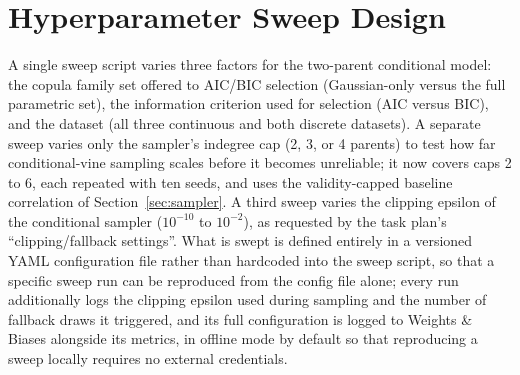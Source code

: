 \documentclass[
  english,
  class=report,
  accentcolor=2c,
  marginpar=false,
  parskip=half-,
  fontsize=11pt,
  ruledheaders=false,
  pdfa=false,
  IMRAD=false,
  thesis={type=master}
]{tudapub}
\begin{document}
\section{Hyperparameter Sweep Design}
\label{sec:sweep}
A single sweep script varies three factors for the two-parent conditional
model: the copula family set offered to AIC/BIC selection (Gaussian-only
versus the full parametric set), the information criterion used for
selection (AIC versus BIC), and the dataset (all three continuous and both
discrete datasets). A separate sweep varies only the sampler's indegree
cap (2, 3, or 4 parents) to test how far conditional-vine sampling scales
before it becomes unreliable; it now covers caps 2 to 6, each repeated with
ten seeds, and uses the validity-capped baseline correlation of
Section~\ref{sec:sampler}. A third sweep varies the clipping epsilon of the
conditional sampler ($10^{-10}$ to $10^{-2}$), as requested by the task
plan's ``clipping/fallback settings''. What is swept is defined entirely in
a versioned YAML configuration file rather than hardcoded into the sweep
script, so that a specific sweep run can be reproduced from the config file
alone; every run additionally logs the clipping epsilon used during
sampling and the number of fallback draws it triggered, and its full
configuration is logged to Weights \& Biases alongside its metrics, in
offline mode by default so that reproducing a sweep locally requires no
external credentials.
\end{document}
